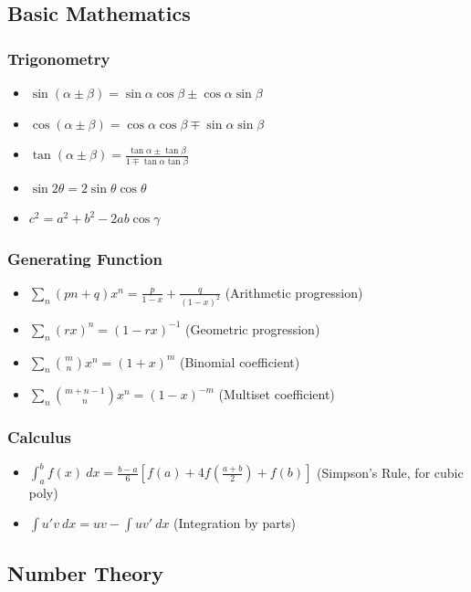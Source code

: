 \documentclass[landscape, 8pt, a4paper, oneside, twocolumn]{extarticle}
\begin{document}
\subsection{Basic Mathematics}

\subsubsection{Trigonometry}
\begin{itemize}
\item $ \sin(\alpha \pm \beta) = \sin\alpha \cos\beta \pm \cos\alpha \sin\beta $
\item $ \cos(\alpha \pm \beta) = \cos\alpha \cos\beta \mp \sin\alpha \sin\beta $
\item $ \tan(\alpha \pm \beta) = \frac{\tan\alpha \pm \tan\beta}{1 \mp \tan\alpha \tan\beta}$
\item $ \sin 2\theta = 2\sin\theta\cos\theta $
\item $ c^2 = a^2 + b^2 - 2ab\cos\gamma$
\end{itemize}
\subsubsection{Generating Function}
\begin{itemize}
    \item $ \sum_{n} (pn + q)x^n = \frac{p}{1-x} + \frac{q}{(1-x)^2}$ (Arithmetic progression)
    \item $ \sum_{n} (rx)^n = (1 - rx)^{-1}$ (Geometric progression)
    \item $ \sum_{n} \binom{m}{n} x^n = (1+x)^m$ (Binomial coefficient)
    \item $ \sum_{n} \binom{m+n-1}{n} x^n = (1-x)^{-m}$ (Multiset coefficient)
\end{itemize}
\subsubsection{Calculus}
\begin{itemize}
    \item $\int_{a}^{b} f(x)\ dx = \frac{b-a}{6}\left[f(a) + 4f(\frac{a+b}{2}) + f(b)\right]$ (Simpson's Rule, for cubic poly)
    \item $\int u'v\ dx = uv - \int uv'\ dx$ (Integration by parts)
\end{itemize}
\subsection{Number Theory}
\end{document}
